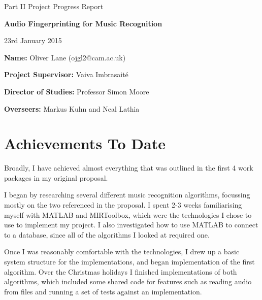\documentclass[12pt]{article}
\begin{document}
\thispagestyle{empty}

\medskip
{}
\medskip
{}

\vfil

\centerline{\large Part II Project Progress Report}
\vspace{0.4in}
\centerline{\Large\bf Audio Fingerprinting for Music Recognition}
\vspace{0.3in}
\centerline{\large 23rd January 2015}

\vfil

{\bf Name:} Oliver Lane (ojgl2@cam.ac.uk)

\vspace{0.2in}

{\bf Project Supervisor:} Vaiva Imbrasait\'{e}

\vspace{0.2in}

{\bf Director of Studies:} Professor Simon Moore

\vspace{0.2in}

{\bf Overseers:} Markus Kuhn and Neal Lathia

\vfil
\eject

\cleardoublepage
\setcounter{page}{1}

\section*{Achievements To Date}

Broadly, I have achieved almost everything that was outlined in the first 4 work packages in my original proposal.

I began by researching several different music recognition algorithms, focussing mostly on the two referenced in the proposal. I spent 2-3 weeks familiarising myself with MATLAB and MIRToolbox, which were the technologies I chose to use to implement my project. I also investigated how to use MATLAB to connect to a database, since all of the algorithms I looked at required one.

Once I was reasonably comfortable with the technologies, I drew up a basic system structure for the implementations, and began implementation of the first algorithm. Over the Christmas holidays I finished implementations of both algorithms, which included some shared code for features such as reading audio from files and running a set of tests against an implementation.
\end{document}
